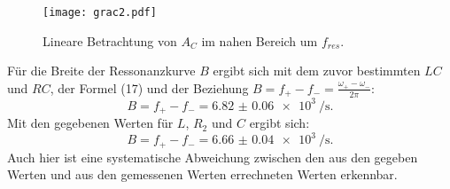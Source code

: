 \begin{figure}[H]
	\centering
	\caption{Lineare Betrachtung von $A_C$ im nahen Bereich um $f_{res}$.}
	\texttt{[image: grac2.pdf]}
	\label{fig:grac2}
\end{figure}

Für die Breite der Ressonanzkurve $B$ ergibt sich mit dem zuvor bestimmten $LC$ und $RC$, der Formel (17) und der Beziehung $B = f_+ - f_- = \frac{\omega_+ - \omega_-}{2\pi}$:
\begin{displaymath}
B = f_+ - f_- = \SI{6.82(6)e3}{\per\second}\text{.}
\end{displaymath}
Mit den gegebenen Werten für $L$, $R_2$ und $C$ ergibt sich:
\begin{displaymath}
B = f_+ - f_- = \SI{6.66(4)e3}{\per\second}\text{.}
\end{displaymath}
Auch hier ist eine systematische Abweichung zwischen den aus den gegeben Werten und aus den gemessenen Werten errechneten Werten erkennbar.



